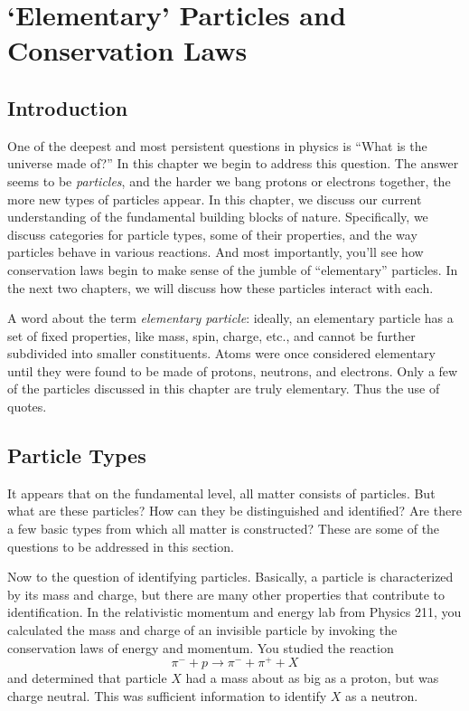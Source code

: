 

\chapter[Particles and Conservation Laws]{`Elementary' Particles and
Conservation Laws}
\label{chapter:particles}

\section{Introduction}

One of the deepest and most persistent questions in physics is
``What is the universe made of?''  In this chapter we begin to
address this question.  The answer seems to be {\em particles},
and the harder we bang protons or electrons together, the more new
types of particles appear. In this chapter, we discuss our current
understanding of the fundamental building blocks of nature.
Specifically, we discuss categories for particle types, some of
their properties, and the way particles behave in various
reactions. And most importantly, you'll see how conservation laws
begin to make sense of the jumble of ``elementary'' particles.  In
the next two chapters, we will discuss how these particles
interact with each.

A word about the term {\em elementary particle}: ideally, an elementary
particle has a set of fixed properties, like mass, spin, charge, etc.,
and cannot be further subdivided into smaller constituents.  Atoms
were once considered elementary until they were found to be made of
protons, neutrons, and electrons.  Only a few of the particles
discussed in this chapter are truly elementary.  Thus the use of
quotes.

\section{Particle Types}

It appears that on the fundamental level, all matter consists of
particles. But what are these particles?  How can they be
distinguished and identified?  Are there a few basic types from
which all matter is constructed?  These are some of the questions
to be addressed in this section.

Now to the question of identifying particles.  Basically, a particle
is characterized by its mass and charge, but there are many other
properties that contribute to identification.  In the relativistic
momentum and energy lab from Physics 211, you calculated the mass and
charge of an invisible particle by invoking the conservation laws of
energy and momentum.  You studied the reaction
\begin{equation}
\pi^- + p \to \pi^- + \pi^+ + X
\end{equation}
and determined that particle $X$ had a mass about as big as a proton,
but was charge neutral.  This was sufficient information to identify
$X$ as a neutron.

